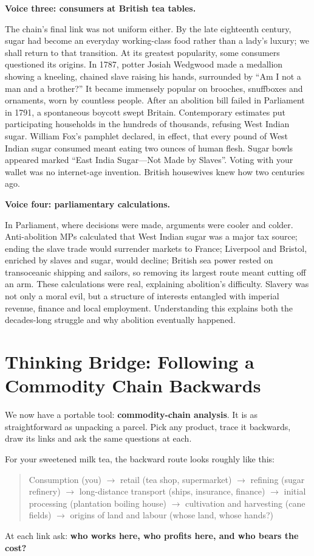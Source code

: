 \textbf{Voice three: consumers at British tea tables.}

The chain's final link was not uniform either. By the late eighteenth century, sugar had become an everyday working-class food rather than a lady's luxury; we shall return to that transition. At its greatest popularity, some consumers questioned its origins. In 1787, potter Josiah Wedgwood made a medallion showing a kneeling, chained slave raising his hands, surrounded by ``Am I not a man and a brother?'' It became immensely popular on brooches, snuffboxes and ornaments, worn by countless people. After an abolition bill failed in Parliament in 1791, a spontaneous boycott swept Britain. Contemporary estimates put participating households in the hundreds of thousands, refusing West Indian sugar. William Fox's pamphlet declared, in effect, that every pound of West Indian sugar consumed meant eating two ounces of human flesh. Sugar bowls appeared marked ``East India Sugar---Not Made by Slaves''. Voting with your wallet was no internet-age invention. British housewives knew how two centuries ago.

\textbf{Voice four: parliamentary calculations.}

In Parliament, where decisions were made, arguments were cooler and colder. Anti-abolition MPs calculated that West Indian sugar was a major tax source; ending the slave trade would surrender markets to France; Liverpool and Bristol, enriched by slaves and sugar, would decline; British sea power rested on transoceanic shipping and sailors, so removing its largest route meant cutting off an arm. These calculations were real, explaining abolition's difficulty. Slavery was not only a moral evil, but a structure of interests entangled with imperial revenue, finance and local employment. Understanding this explains both the decades-long struggle and why abolition eventually happened.

\section[Thinking Bridge: Trace the Commodity]{Thinking Bridge: Following a Commodity Chain Backwards}
We now have a portable tool: \textbf{commodity-chain analysis}. It is as straightforward as unpacking a parcel. Pick any product, trace it backwards, draw its links and ask the same questions at each.

For your sweetened milk tea, the backward route looks roughly like this:

\begin{quote}
Consumption (you) $\rightarrow$ retail (tea shop, supermarket) $\rightarrow$ refining (sugar refinery) $\rightarrow$ long-distance transport (ships, insurance, finance) $\rightarrow$ initial processing (plantation boiling house) $\rightarrow$ cultivation and harvesting (cane fields) $\rightarrow$ origins of land and labour (whose land, whose hands?)
\end{quote}
At each link ask: \textbf{who works here, who profits here, and who bears the cost?}

